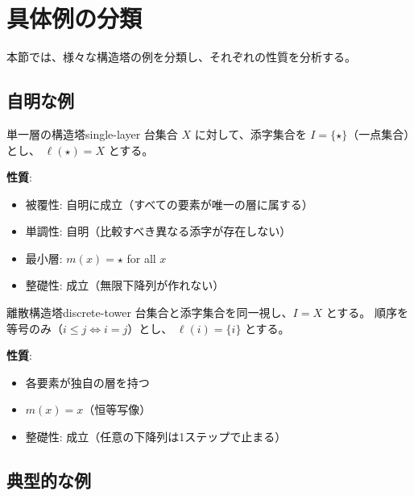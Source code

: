 \documentclass[a4paper,12pt]{ltjsarticle}
\begin{document}
\section{具体例の分類}

本節では、様々な構造塔の例を分類し、それぞれの性質を分析する。

\subsection{自明な例}

\begin{example}{単一層の構造塔}{single-layer}
台集合 $X$ に対して、添字集合を $I = \{\star\}$（一点集合）とし、
$\ell(\star) = X$ とする。

\textbf{性質}:
\begin{itemize}
    \item 被覆性: 自明に成立（すべての要素が唯一の層に属する）
    \item 単調性: 自明（比較すべき異なる添字が存在しない）
    \item 最小層: $m(x) = \star$ for all $x$
    \item 整礎性: 成立（無限下降列が作れない）
\end{itemize}
\end{example}

\begin{example}{離散構造塔}{discrete-tower}
台集合と添字集合を同一視し、$I = X$ とする。
順序を等号のみ（$i \leq j \iff i = j$）とし、
$\ell(i) = \{i\}$ とする。

\textbf{性質}:
\begin{itemize}
    \item 各要素が独自の層を持つ
    \item $m(x) = x$（恒等写像）
    \item 整礎性: 成立（任意の下降列は1ステップで止まる）
\end{itemize}
\end{example}

\subsection{典型的な例}
\end{document}
